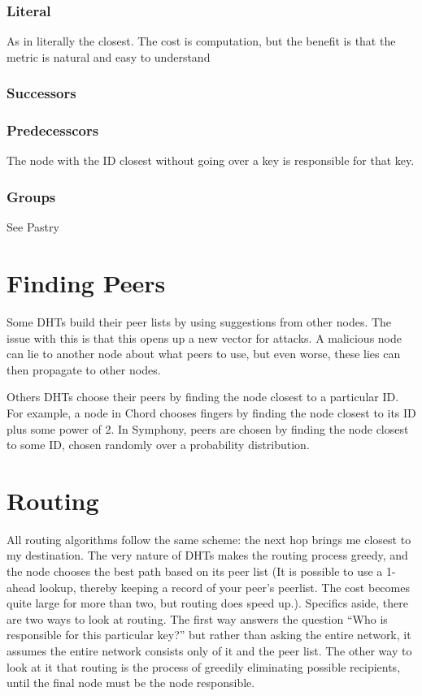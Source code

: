\documentclass[10pt,letterpaper]{report}
\begin{document}
\subsubsection{Literal}
As in literally the closest.  The cost is computation, but the benefit is that the metric is natural and easy to understand

\subsubsection{Successors}


\subsubsection{Predecesscors}
The node with the ID closest without going over a key is responsible for that key.


\subsubsection{Groups}

See Pastry


\section{Finding Peers}

Some DHTs build their peer lists by using suggestions from other nodes.  The issue with this is that this opens up a new vector for attacks.   A malicious node can lie to another node about what peers to use, but even worse, these lies can then propagate to other nodes.

Others DHTs choose their peers by finding the node closest to a particular ID.  For example, a node in Chord chooses fingers by finding the node closest to its ID plus some  power of 2.    In Symphony, peers are chosen by finding the node closest to some ID, chosen randomly over a probability distribution.



\section{Routing}
All routing algorithms follow the same scheme:  the next hop  brings me closest to my destination.  The very nature of DHTs makes the routing process greedy, and the node chooses the best path based on its peer list (It is possible to use a 1-ahead lookup, thereby keeping a record of your peer's peerlist.  The cost becomes quite large for more than two, but routing does speed up.).  Specifics aside, there are two ways to look at routing.  The first way  answers the question ``Who is responsible for this particular key?''  but rather than asking the entire network, it assumes the entire network consists only of it and the peer list.  The other way to look at it that routing is the process of greedily  eliminating possible recipients, until the final node must be the node responsible.  
\end{document}
